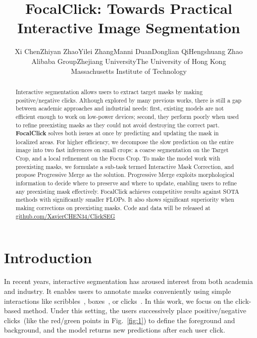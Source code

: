 \documentclass[10pt,twocolumn,letterpaper]{article}
\begin{document}
\title{FocalClick: Towards Practical Interactive Image Segmentation }
\author{Xi Chen\quad Zhiyan Zhao\quad Yilei Zhang\quad Manni Duan\quad Donglian Qi\quad Hengshuang Zhao\\
Alibaba Group\quad Zhejiang University\quad The University of Hong Kong\\
Massachusetts Institute of Technology\\
}
\maketitle



\begin{abstract}
Interactive segmentation allows users to extract target masks by making positive/negative clicks. Although explored by many previous works, there is still a gap between academic approaches and industrial needs: first, existing models are not efficient enough to work on low-power devices;  second, they perform poorly when used to refine preexisting masks as they could not avoid destroying the correct part.
\textbf{FocalClick} solves both issues at once by predicting and updating the mask in localized areas. 
For higher efficiency, we decompose the slow prediction on the entire image into two fast inferences on small crops: a coarse segmentation on the Target Crop, and a local refinement on the Focus Crop.  To make the model work with preexisting masks, we formulate a sub-task termed Interactive Mask Correction, and propose Progressive Merge as the solution. Progressive Merge exploits morphological information to decide where to preserve and where to update, enabling users to refine any preexisting mask effectively.
FocalClick achieves competitive results against SOTA methods with significantly smaller FLOPs. It also shows significant superiority when making corrections on preexisting masks.
Code and data will be released at \href{https://github.com/XavierCHEN34/ClickSEG/}{github.com/XavierCHEN34/ClickSEG} 
\end{abstract}


\section{Introduction}
In recent years, interactive segmentation has aroused interest from both academia and industry. It enables users to annotate masks conveniently using simple interactions like scribbles~\cite{li2004lazy,grady2006random,bai2014error}, boxes~\cite{rother2004grabcut,wu2014milcut,lempitsky2009image}, or clicks~\cite{fbrs,firstclick,xu2016deep,jang2019brs,chen2021cdnet,sofiiuk2021ritm}. In this work, we focus on the click-based method. Under this setting, the users successively place positive/negative clicks~(like the red/green points in Fig.~\ref{fig:1}) to define the foreground and background, and the model returns new predictions after each user click. 
\end{document}
